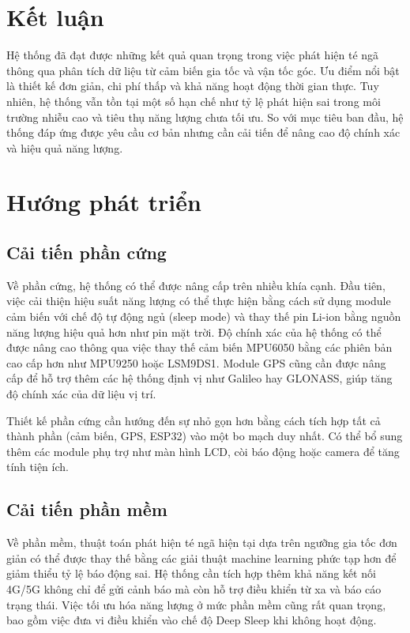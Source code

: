 \documentclass[a4paper,12pt]{report}
\begin{document}
	\section{Kết luận}
	Hệ thống đã đạt được những kết quả quan trọng trong việc phát hiện té ngã thông qua phân tích dữ liệu từ cảm biến gia tốc và vận tốc góc. Ưu điểm nổi bật là thiết kế đơn giản, chi phí thấp và khả năng hoạt động thời gian thực. Tuy nhiên, hệ thống vẫn tồn tại một số hạn chế như tỷ lệ phát hiện sai trong môi trường nhiễu cao và tiêu thụ năng lượng chưa tối ưu. So với mục tiêu ban đầu, hệ thống đáp ứng được yêu cầu cơ bản nhưng cần cải tiến để nâng cao độ chính xác và hiệu quả năng lượng.
	
	\section{Hướng phát triển}
	
	\subsection{Cải tiến phần cứng}
	Về phần cứng, hệ thống có thể được nâng cấp trên nhiều khía cạnh. Đầu tiên, việc cải thiện hiệu suất năng lượng có thể thực hiện bằng cách sử dụng module cảm biến với chế độ tự động ngủ (sleep mode) và thay thế pin Li-ion bằng nguồn năng lượng hiệu quả hơn như pin mặt trời. 
	Độ chính xác của hệ thống có thể được nâng cao thông qua việc thay thế cảm biến MPU6050 bằng các phiên bản cao cấp hơn như MPU9250 hoặc LSM9DS1. Module GPS cũng cần được nâng cấp để hỗ trợ thêm các hệ thống định vị như Galileo hay GLONASS, giúp tăng độ chính xác của dữ liệu vị trí.
	
	Thiết kế phần cứng cần hướng đến sự nhỏ gọn hơn bằng cách tích hợp tất cả thành phần (cảm biến, GPS, ESP32) vào một bo mạch duy nhất. Có thể bổ sung thêm các module phụ trợ như màn hình LCD, còi báo động hoặc camera để tăng tính tiện ích.
	
	\subsection{Cải tiến phần mềm}
	Về phần mềm, thuật toán phát hiện té ngã hiện tại dựa trên ngưỡng gia tốc đơn giản có thể được thay thế bằng các giải thuật machine learning phức tạp hơn để giảm thiểu tỷ lệ báo động sai. Hệ thống cần tích hợp thêm khả năng kết nối 4G/5G không chỉ để gửi cảnh báo mà còn hỗ trợ điều khiển từ xa và báo cáo trạng thái. Việc tối ưu hóa năng lượng ở mức phần mềm cũng rất quan trọng, bao gồm việc đưa vi điều khiển vào chế độ Deep Sleep khi không hoạt động.
	
\end{document}
